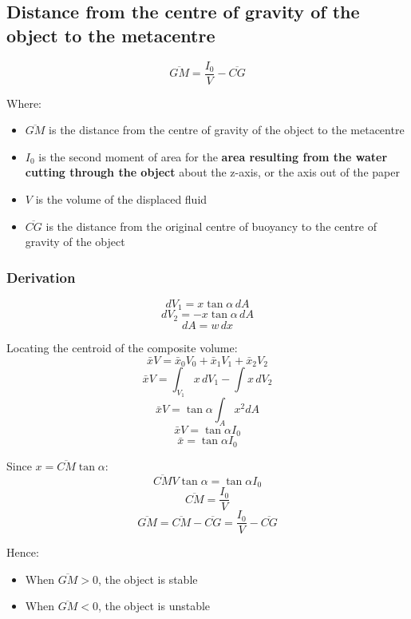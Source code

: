 \documentclass[11pt]{article}
\begin{document}
\subsection{Distance from the centre of gravity of the object to the metacentre}
\label{sec:org438c7b9}
\[\overline{GM} = \frac{I_0}{V} - \overline{CG}\]

Where:
\begin{itemize}
\item \(\overline{GM}\) is the distance from the centre of gravity of the object to the metacentre
\item \(I_0\) is the second moment of area for the \textbf{area resulting from the water cutting through the object} about the z-axis, or the axis out of the paper
\item \(V\) is the volume of the displaced fluid
\item \(\overline{CG}\) is the distance from the original centre of buoyancy to the centre of gravity of the object
\end{itemize}
\subsubsection{Derivation}
\label{sec:orgb22df62}
\[dV_1 = x \tan \alpha \, dA\]
\[dV_2 = - x \tan \alpha \, dA\]
\[dA = w \, dx\]

Locating the centroid of the composite volume:
\[\bar{x} V = \bar{x}_0 V_0 + \bar{x}_1 V_1 + \bar{x}_2 V_2\]
\[\bar{x} V = \int_{V_1} x \, dV_1 - \int x \, dV_2\]
\[\bar{x} V = \tan \alpha \int_A x^2 dA\]
\[\bar{x} V = \tan \alpha I_0\]
\[\bar{x} = \tan \alpha I_0\]

Since \(x = \overline{CM} \tan \alpha\):
\[\overline{CM} V \tan \alpha = \tan \alpha I_0\]
\[\overline{CM} = \frac{I_0}{V}\]
\[\overline{GM} = \overline{CM} - \overline{CG} = \frac{I_0}{V} - \overline{CG}\]

\newpage

Hence:
\begin{itemize}
\item When \(\overline{GM} > 0\), the object is stable
\item When \(\overline{GM} < 0\), the object is unstable
\end{itemize}

\[\]
\end{document}
